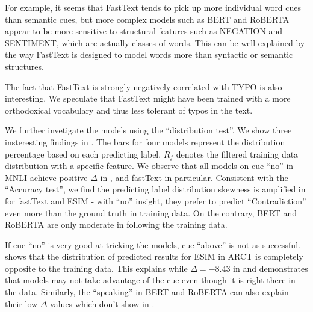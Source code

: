 For example, it seems that FastText tends to pick up more individual word cues
than semantic cues, but more complex models such as BERT
and RoBERTA appear to be more sensitive to structural features such as NEGATION
and SENTIMENT, which are actually classes of words. 
This can be well explained by the way FastText is designed to
model words more than syntactic or semantic structures.

The fact that FastText is strongly negatively correlated with TYPO is
also interesting. We speculate that FastText might have been
trained with a more orthodoxical vocabulary and thus less
tolerant of typos in the text. 

We further invetigate the models using the
``distribution test''. 
We show three insteresting findings in . 
The bars for four models represent the distribution percentage based on each 
predicting label. $R_f$ denotes the filtered training data distribution with a specific feature.  
We observe that all models on cue ``no'' in MNLI 
achieve positive $\Delta$ in , and fastText in particular. 
Consistent with the ``Accuracy test'', we find the predicting label distribution 
skewness is amplified in  for fastText and ESIM -  
with ``no'' insight, they prefer to predict ``Contradiction'' even more
than the ground truth in training data.
On the contrary, BERT and RoBERTA are only moderate in following
the training data. 

If cue ``no'' is very good at tricking the models,
cue ``above'' is not as successful. 
 shows that 
the distribution of predicted results for ESIM in ARCT 
is completely opposite to the training data. 
This explains while $\Delta=-8.43$ in  and
demonstrates that models may not take advantage of the cue even though it is
right there in the data.
Similarly, the ``speaking'' in BERT and RoBERTA 
can also explain their low $\Delta$ values which don't show in . 


